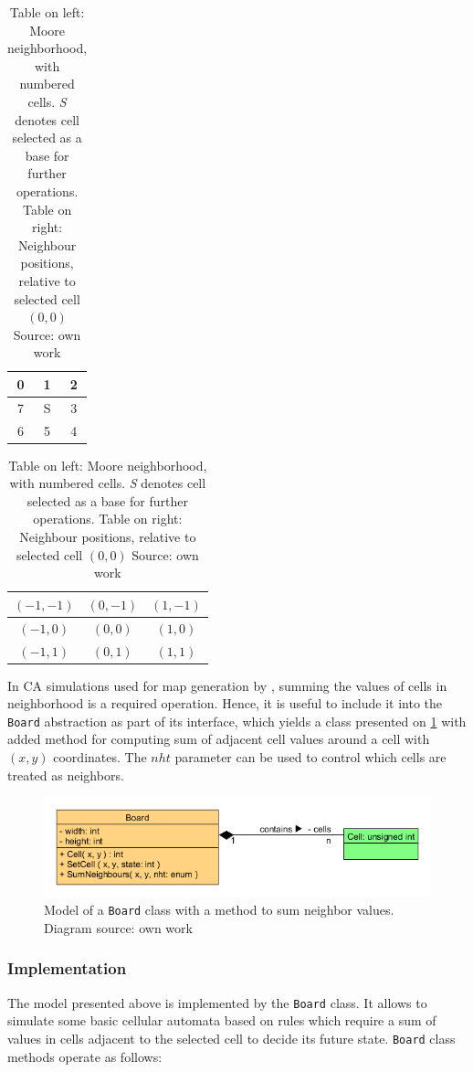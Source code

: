 \documentclass[12pt]{report}
\begin{document}
\begin{table}[h] 
	\centering 
	\begin{tabular}{| c | c | c |}\hline 
		0 & 1 & 2 \\ \hline
		7 & S & 3 \\ \hline
		6 & 5 & 4 \\ \hline
	\end{tabular} 
	\begin{tabular}{| c | c | c |}\hline 
		$(-1,-1)$ & $( 0,-1)$ & $( 1,-1)$ \\ \hline
		$(-1, 0)$ & $( 0, 0)$ & $( 1, 0)$ \\ \hline
		$(-1, 1)$ & $( 0, 1)$ & $( 1, 1)$ \\ \hline
	\end{tabular} 
	\caption{Table on left: Moore neighborhood, with numbered cells. \textit{S} denotes cell selected as a base for further operations. Table on right: Neighbour positions, relative to selected cell $(0,0)$ Source: own work}
	\label{tab:cellneighbors}
\end{table}

In CA simulations used for map generation by \autocite{johnson2010cellular}, summing the values of cells in neighborhood is a required operation. Hence, it is useful to include it into the \texttt{Board} abstraction as part of its interface, which yields a class presented on \cref{fig:boardcell2} with added method for computing sum of adjacent cell values around a cell with $(x,y)$ coordinates. The $nht$ parameter can be used to control which cells are treated as neighbors.

\begin{figure}[H]
	\centering
	\includegraphics[width=0.8\linewidth]{diagrams/boardcell02}
	\caption{Model of a \texttt{Board} class with a method to sum neighbor values. Diagram source: own work} 
	\label{fig:boardcell2}
\end{figure} 

\subsubsection{Implementation}
 
The model presented above is implemented by the \texttt{Board} class. It allows to simulate some basic cellular automata based on rules which require a sum of values in cells adjacent to the selected cell to decide its future state. \texttt{Board} class methods operate as follows:
\end{document}
